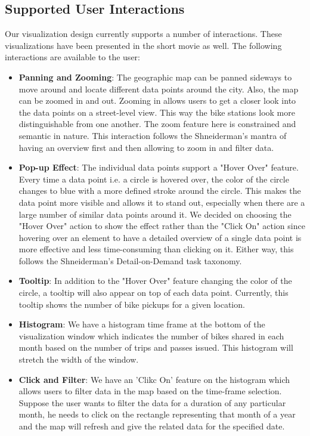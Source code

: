 \subsection{Supported User Interactions}
\label{sec:user interactions}
Our visualization design currently supports a number of interactions. These visualizations have been presented in the short movie as well. The following interactions are available to the user:
\begin{itemize}
    \item \textbf{Panning and Zooming}: The geographic map can be panned sideways to move around and locate different data points around the city. Also, the map can be zoomed in and out. Zooming in allows users to get a closer look into the data points on a street-level view. This way the bike stations look more distinguishable from one another. The zoom feature here is constrained and semantic in nature. This interaction follows the Shneiderman's mantra of having an overview first and then allowing to zoom in and filter data.
    \item \textbf{Pop-up Effect}: The individual data points support a "Hover Over" feature. Every time a data point i.e. a circle is hovered over, the color of the circle changes to blue with a more defined stroke around the circle. This makes the data point more visible and allows it to stand out, especially when there are a large number of similar data points around it. We decided on choosing the "Hover Over" action to show the effect rather than the "Click On" action since hovering over an element to have a detailed overview of a single data point is more effective and less time-consuming than clicking on it. Either way, this follows the Shneiderman's Detail-on-Demand task taxonomy.
    \item \textbf{Tooltip}: In addition to the "Hover Over" feature changing the color of the circle, a tooltip will also appear on top of each data point. Currently, this tooltip shows the number of bike pickups for a given location.
    \item \textbf{Histogram}: We have a histogram time frame at the bottom of the visualization window which indicates the number of bikes shared in each month based on the number of trips and passes issued. This histogram will stretch the width of the window. 
    \item \textbf{Click and Filter}: We have an 'Clikc On' feature on the histogram which allows users to filter data in the map based on the time-frame selection. Suppose the user wants to filter the data for a duration of any particular month, he needs to click on the rectangle representing that month of a year and the map will refresh and give the related data for the specified date.
\end{itemize}


